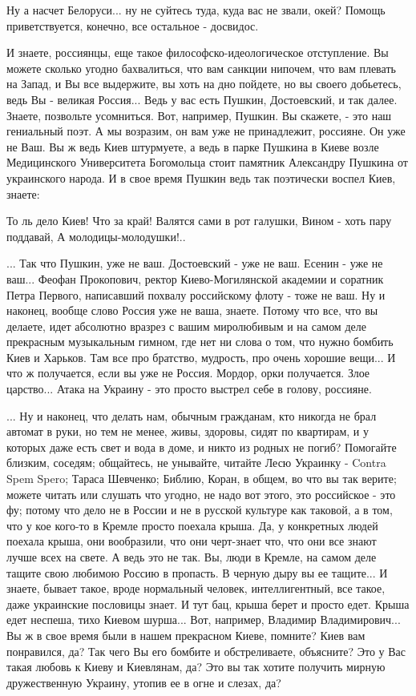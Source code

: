 Ну а насчет Белоруси... ну не суйтесь туда, куда вас не звали, окей? Помощь
приветствуется, конечно, все остальное - досвидос.

И знаете, россиянцы, еще такое философско-идеологическое отступление.  Вы
можете сколько угодно бахвалиться, что вам санкции нипочем, что вам плевать на
Запад, и Вы все выдержите, вы хоть на дно пойдете, но вы своего добьетесь, ведь
Вы - великая Россия...  Ведь у вас есть Пушкин, Достоевский, и так далее.
Знаете, позвольте усомниться. Вот, например, Пушкин. Вы скажете, - это наш
гениальный поэт. А мы возразим, он вам уже не принадлежит, россияне. Он уже не
Ваш.  Вы ж ведь Киев штурмуете, а ведь в парке Пушкина в Киеве возле
Медицинского Университета Богомольца стоит памятник Александру Пушкина от
украинского народа. И в свое время Пушкин ведь так поэтически воспел Киев,
знаете: 

\begin{zzquote}
То ль дело Киев! Что за край!  Валятся сами в рот галушки,
Вином - хоть пару поддавай, А молодицы-молодушки!..
\end{zzquote}

... Так что Пушкин, уже не ваш. Достоевский - уже не ваш. Есенин - уже не
ваш... Феофан Прокопович, ректор Киево-Могилянской академии и соратник Петра
Первого, написавший похвалу российскому флоту - тоже не ваш. Ну и наконец,
вообще слово Россия уже не ваша, знаете. Потому что все, что вы делаете, идет
абсолютно вразрез с вашим миролюбивым и на самом деле прекрасным музыкальным
гимном, где нет ни слова о том, что нужно бомбить Киев и Харьков. Там все про
братство, мудрость, про очень хорошие вещи... И что ж получается, если вы уже
не Россия.  Мордор, орки получается. Злое царство... Атака на Украину - это
просто выстрел себе в голову, россияне.

... Ну и наконец, что делать нам, обычным гражданам, кто никогда не брал
автомат в руки, но тем не менее, живы, здоровы, сидят по квартирам, и у которых
даже есть свет и вода в доме, и никто из родных не погиб? Помогайте близким,
соседям; общайтесь, не унывайте, читайте Лесю Украинку - Contra Spem Spero;
Тараса Шевченко; Библию, Коран, в общем, во что вы так верите; можете читать
или слушать что угодно, не надо вот этого, это российское - это фу; потому что
дело не в России и не в русской культуре как таковой, а в том, что у кое
кого-то в Кремле просто поехала крыша. Да, у конкретных людей поехала крыша,
они вообразили, что они черт-знает что, что они все знают лучше всех на свете.
А ведь это не так. Вы, люди в Кремле, на самом деле тащите свою любимою Россию
в пропасть. В черную дыру вы ее тащите... И знаете, бывает такое, вроде
нормальный человек, интеллигентный, все такое, даже украинские пословицы знает.
И тут бац, крыша берет и просто едет. Крыша едет неспеша, тихо Киевом шурша...
Вот, например, Владимир Владимирович... Вы ж в свое время были в нашем
прекрасном Киеве, помните? Киев вам понравился, да? Так чего Вы его бомбите и
обстреливаете, объясните? Это у Вас такая любовь к Киеву и Киевлянам, да? Это
вы так хотите получить мирную дружественную Украину, утопив ее в огне и слезах,
да?

